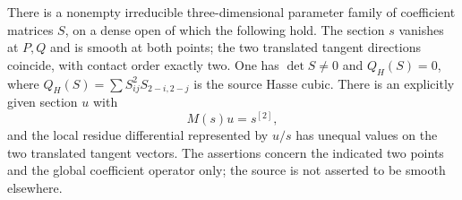 \begin{lemma}
\label{lem:ss-uniform-local-contact}
There is a nonempty irreducible three-dimensional parameter family
of coefficient matrices $S$, on a dense open of which the following
hold. The section $s$ vanishes at $P,Q$ and is smooth at both points;
the two translated tangent directions coincide, with contact order
exactly two. One has $\det S\ne0$ and $Q_H(S)=0$, where
$Q_H(S)=\sum S_{ij}^2S_{2-i,2-j}$ is the source Hasse cubic.
There is an explicitly given section $u$ with
\[
                         M(s)u=s^{[2]},
\]
and the local residue differential represented by $u/s$ has unequal
values on the two translated tangent vectors. The assertions concern
the indicated two points and the global coefficient operator only;
the source is not asserted to be smooth elsewhere.
\end{lemma}
